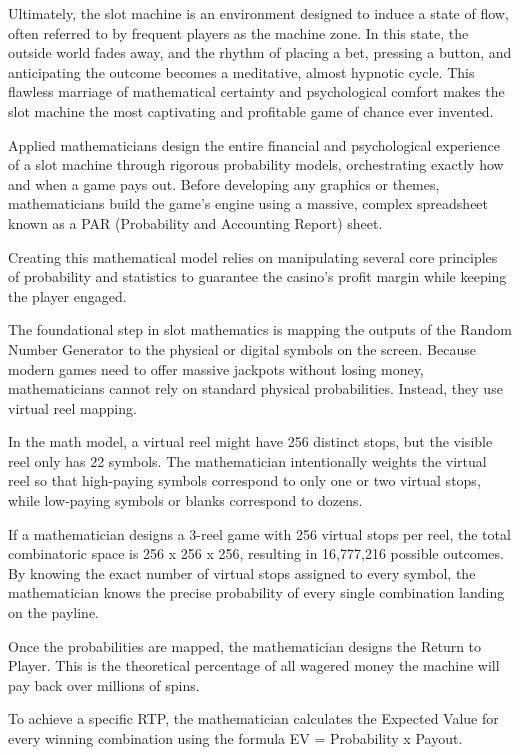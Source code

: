 \documentclass[12pt,twoside,openany]{book}
\begin{document}
Ultimately, the slot machine is an environment designed to induce a state of flow, often referred to by frequent players as the machine zone. In this state, the outside world fades away, and the rhythm of placing a bet, pressing a button, and anticipating the outcome becomes a meditative, almost hypnotic cycle. This flawless marriage of mathematical certainty and psychological comfort makes the slot machine the most captivating and profitable game of chance ever invented.

Applied mathematicians design the entire financial and psychological experience of a slot machine through rigorous probability models, orchestrating exactly how and when a game pays out. Before developing any graphics or themes, mathematicians build the game's engine using a massive, complex spreadsheet known as a PAR (Probability and Accounting Report) sheet.

Creating this mathematical model relies on manipulating several core principles of probability and statistics to guarantee the casino's profit margin while keeping the player engaged.

The foundational step in slot mathematics is mapping the outputs of the Random Number Generator to the physical or digital symbols on the screen. Because modern games need to offer massive jackpots without losing money, mathematicians cannot rely on standard physical probabilities. Instead, they use virtual reel mapping.

In the math model, a virtual reel might have 256 distinct stops, but the visible reel only has 22 symbols. The mathematician intentionally weights the virtual reel so that high-paying symbols correspond to only one or two virtual stops, while low-paying symbols or blanks correspond to dozens.

If a mathematician designs a 3-reel game with 256 virtual stops per reel, the total combinatoric space is 256 x 256 x 256, resulting in 16,777,216 possible outcomes. By knowing the exact number of virtual stops assigned to every symbol, the mathematician knows the precise probability of every single combination landing on the payline.

Once the probabilities are mapped, the mathematician designs the Return to Player. This is the theoretical percentage of all wagered money the machine will pay back over millions of spins.

To achieve a specific RTP, the mathematician calculates the Expected Value for every winning combination using the formula EV = Probability x Payout.
\end{document}
